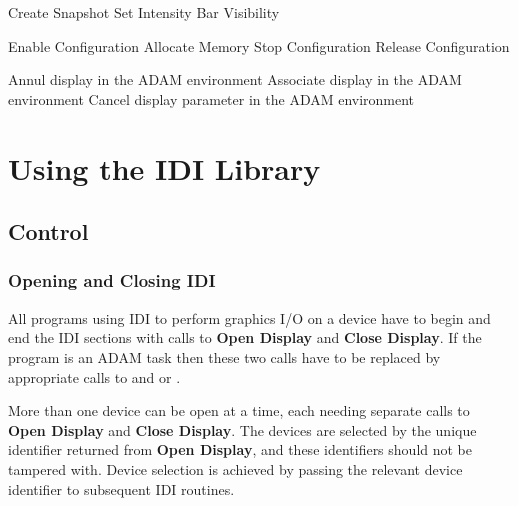 \begin{routinelist}
               {Create Snapshot}
               {Set Intensity Bar Visibility}
\end{routinelist}
\begin{routinelist}
               {Enable Configuration}
               {Allocate Memory}
               {Stop Configuration}
               {Release Configuration}
\end{routinelist}
\begin{routinelist}
               {Annul display in the ADAM environment}
               {Associate display in the ADAM environment}
               {Cancel display parameter in the ADAM environment}
\end{routinelist}

\section{Using the IDI Library}

\subsection{Control}

\subsubsection{Opening and Closing IDI}

All programs using IDI to perform graphics I/O on a device have to begin and
end the IDI sections with calls to {\bf Open Display} and {\bf Close Display}.
If the program is an ADAM task then these two calls have to be replaced by
appropriate calls to  and
 or 
.

More than one device can be open at a time, each needing separate calls
to {\bf Open Display} and {\bf Close Display}. The devices are selected
by the unique identifier returned from {\bf Open Display}, and these
identifiers should not be tampered with. Device selection is achieved by
passing the relevant device identifier to subsequent IDI routines.

